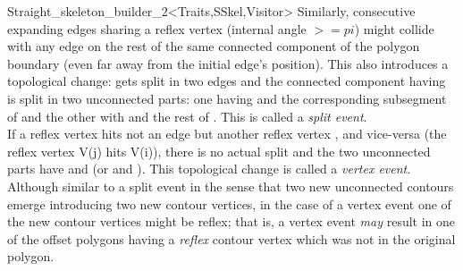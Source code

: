 \begin{ccRefClass}{Straight_skeleton_builder_2<Traits,SSkel,Visitor>}
Similarly, consecutive expanding edges  sharing a reflex vertex (internal angle $>=pi$) might collide with any edge  on the rest of the same connected component of the polygon boundary (even far away from the initial edge's position). This also introduces a topological change:  gets split in two edges and the connected component having  is split in two unconnected parts: one having  and the corresponding subsegment of  and the other with  and the rest of . This is called a {\em split event}.\\ If a reflex vertex hits not an edge  but another reflex vertex , and vice-versa (the reflex vertex V(j) hits V(i)), there is no actual split and the two unconnected parts have  and  (or  and ). This topological change is called a {\em vertex event}. Although similar to a split event in the sense that two new unconnected contours emerge introducing two new contour vertices, in the case of a vertex event one of the new contour vertices might be reflex; that is, a vertex event \textit{may} result in one of the offset polygons having a \textit{reflex} contour vertex which was not in the original polygon.


\end{ccRefClass}

